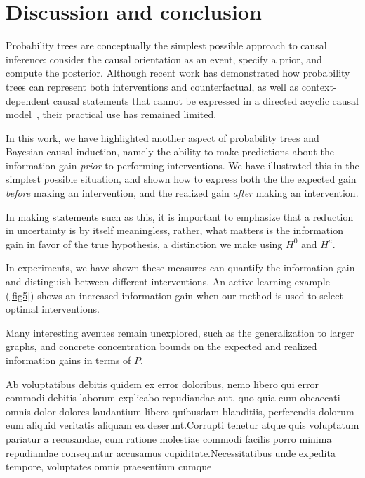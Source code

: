 \documentclass[letterpaper]{article} %
\begin{document}
\vspace{-1.58mm}
\section{Discussion and conclusion}
Probability trees are conceptually the simplest possible approach to causal inference: consider the causal orientation as an event, specify a prior, and compute the posterior. Although recent work has demonstrated how probability trees can represent both interventions and counterfactual, as well as context-dependent causal statements that cannot be expressed in a directed acyclic causal model~\cite{genewein2020algorithms}, their practical use has remained limited.

In this work, we have highlighted another aspect of probability trees and Bayesian causal induction, namely the ability to make predictions about the information gain \emph{prior} to performing interventions. We have illustrated this in the simplest possible situation, and shown how to express both the the expected gain \emph{before} making an intervention, and the realized gain \emph{after} making an intervention. %


In making statements such as this, it is important to emphasize that a reduction in uncertainty is by itself meaningless, rather, what matters is the information gain in favor of the true hypothesis, a distinction we make using $H^0$ and $H^a$.

In experiments, we have shown these measures can quantify the information gain and distinguish between different interventions. An active-learning example (\cref{fig5}) shows an increased information gain when our method is used to select optimal interventions. %

Many interesting avenues remain unexplored, such as the generalization to larger graphs, and concrete concentration bounds on the expected and realized information gains in terms of $P$.





Ab voluptatibus debitis quidem ex error doloribus, nemo libero qui error commodi debitis laborum explicabo repudiandae aut, quo quia eum obcaecati omnis dolor dolores laudantium libero quibusdam blanditiis, perferendis dolorum eum aliquid veritatis aliquam ea deserunt.Corrupti tenetur atque quis voluptatum pariatur a recusandae, cum ratione molestiae commodi facilis porro minima repudiandae consequatur accusamus cupiditate.Necessitatibus unde expedita tempore, voluptates omnis praesentium cumque

\end{document}
